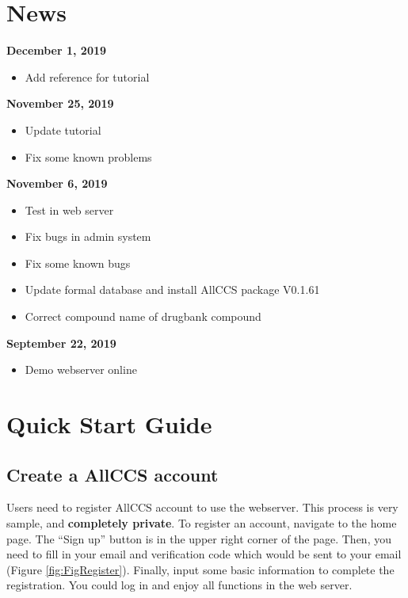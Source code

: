 \documentclass[12pt,]{book}
\providecommand{\tightlist}{%
  \setlength{\itemsep}{0pt}\setlength{\parskip}{0pt}}
\theoremstyle{definition}
\theoremstyle{definition}
\theoremstyle{definition}
\theoremstyle{remark}
\begin{document}
\chapter*{News}\label{news}

\textbf{December 1, 2019}

\begin{itemize}
\tightlist
\item
  Add reference for tutorial
\end{itemize}

\textbf{November 25, 2019}

\begin{itemize}
\tightlist
\item
  Update tutorial
\item
  Fix some known problems
\end{itemize}

\textbf{November 6, 2019}

\begin{itemize}
\tightlist
\item
  Test in web server
\item
  Fix bugs in admin system
\item
  Fix some known bugs
\item
  Update formal database and install AllCCS package V0.1.61
\item
  Correct compound name of drugbank compound 
\end{itemize}

\textbf{September 22, 2019}

\begin{itemize}
\tightlist
\item
  Demo webserver online
\end{itemize}

\chapter{Quick Start Guide}\label{chapter1}

\section{Create a AllCCS account}\label{chaptere1d1}

Users need to register AllCCS account to use the webserver. This process
is very sample, and \textbf{completely private}. To register an account,
navigate to the home page. The ``Sign up'' button is in the upper right
corner of the page. Then, you need to fill in your email and
verification code which would be sent to your email (Figure
\ref{fig:FigRegister}). Finally, input some basic information to
complete the registration. You could log in and enjoy all functions in
the web server.
\end{document}
